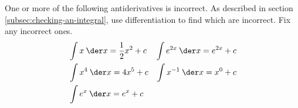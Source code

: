 One or more of the following antiderivatives is incorrect.
As described in section \ref{subsec:checking-an-integral}, use differentiation
to find which are incorrect. Fix any incorrect ones.
\begin{align*}
  & \int x\:\der x = \frac{1}{2}x^2+c       & \int e^{2x}\:\der x = e^{2x}+c \\
  & \int x^4\:\der x = 4x^5+c               & \int x^{-1}\:\der x = x^0+c  \\
  & \int e^x\:\der x = e^x+c 
\end{align*}
